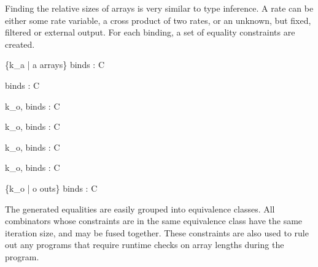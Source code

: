 Finding the relative sizes of arrays is very similar to type inference.
A rate can be either some rate variable, a cross product of two rates, or an unknown, but fixed, filtered or external output.
For each binding, a set of equality constraints are created.

\vspace{1em}

      { \{k_a | a \in arrays\} \vdash binds : C}

\vspace{1em}

      {\Gamma \vdash binds                 : C}

\vspace{1em}

      {k_o, \Gamma \vdash binds                 : C}

\vspace{1em}

      {k_o, \Gamma \vdash binds                 : C}

\vspace{1em}

      {k_o, \Gamma \vdash binds                 : C}

\vspace{1em}

      {k_o, \Gamma \vdash binds                 : C}

\vspace{1em}

      {\{k_o | o \in outs\} \cup \Gamma \vdash binds                 : C}

\vspace{1em}

The generated equalities are easily grouped into equivalence classes.
All combinators whose constraints are in the same equivalence class have the same iteration size, and may be fused together.
These constraints are also used to rule out any programs that require runtime checks on array lengths during the program.


